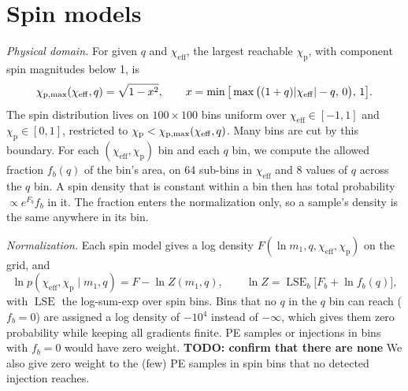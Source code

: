 \documentclass[%
 onecolumn,
 amsmath,amssymb,
 aps,
 prl,
 nofootinbib,nobibnotes,
]{revtex4-2}
\newcommand{\chieff}{\ensuremath{\chi_{\mathrm{eff}}}}
\newcommand{\chip}{\ensuremath{\chi_{\mathrm{p}}}}
\newcommand{\todo}[1]{{\color{Blue}\bf TODO: #1}}
\newcommand{\LSE}{\operatorname{LSE}}
\begin{document}
\section{Spin models}
\label{sm: spin models}

\textit{Physical domain.} For given $q$ and $\chieff$, the largest reachable $\chip$, with component spin magnitudes below 1, is~\cite{iwaya_analytic_2025}
\begin{equation}
    \chi_{\rm p, max}(\chieff, q) = \sqrt{1 - x^2}, \qquad x = \min\big[\max\big((1 + q)|\chieff| - q,\, 0\big),\, 1\big].
\end{equation}
The spin distribution lives on $100 \times 100$ bins uniform over $\chieff \in [-1, 1]$ and $\chip \in [0, 1]$, restricted to $\chip < \chi_{\rm p, max}(\chieff, q)$. Many bins are cut by this boundary. For each $(\chieff, \chip)$ bin and each $q$ bin, we compute the allowed fraction $f_b(q)$ of the bin's area, on 64 sub-bins in $\chieff$ and 8 values of $q$ across the $q$ bin. A spin density that is constant within a bin then has total probability $\propto e^{F_b} f_b$ in it. The fraction enters the normalization only, so a sample's density is the same anywhere in its bin.

\textit{Normalization.} Each spin model gives a log density $F(\ln m_1, q, \chieff, \chip)$ on the grid, and
\begin{equation}
    \ln p(\chieff, \chip \mid m_1, q) = F - \ln Z(m_1, q), \qquad \ln Z = \LSE_{b}\big[F_b + \ln f_b(q)\big],
\end{equation}
with $\LSE$ the log-sum-exp over spin bins. Bins that no $q$ in the $q$ bin can reach ($f_b = 0$) are assigned a log density of $-10^4$ instead of $-\infty$, which gives them zero probability while keeping all gradients finite. \ac{PE} samples or injections in bins with $f_b = 0$ would have zero weight. \todo{confirm that there are none} We also give zero weight to the (few) \ac{PE} samples in spin bins that no detected injection reaches.
\end{document}
